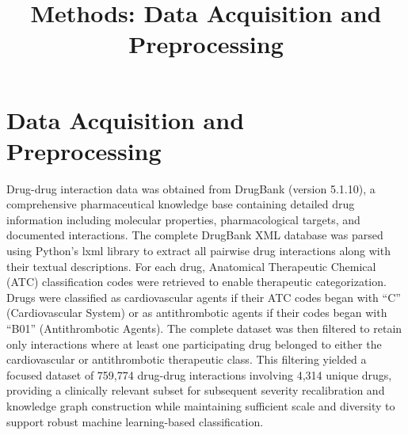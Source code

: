 \documentclass[11pt,a4paper]{article}
\title{\textbf{Methods: Data Acquisition and Preprocessing}}
\author{}
\date{}
\begin{document}
\maketitle

\section*{Data Acquisition and Preprocessing}

Drug-drug interaction data was obtained from DrugBank (version 5.1.10), a comprehensive pharmaceutical knowledge base containing detailed drug information including molecular properties, pharmacological targets, and documented interactions. The complete DrugBank XML database was parsed using Python's lxml library to extract all pairwise drug interactions along with their textual descriptions. For each drug, Anatomical Therapeutic Chemical (ATC) classification codes were retrieved to enable therapeutic categorization. Drugs were classified as cardiovascular agents if their ATC codes began with ``C'' (Cardiovascular System) or as antithrombotic agents if their codes began with ``B01'' (Antithrombotic Agents). The complete dataset was then filtered to retain only interactions where at least one participating drug belonged to either the cardiovascular or antithrombotic therapeutic class. This filtering yielded a focused dataset of 759,774 drug-drug interactions involving 4,314 unique drugs, providing a clinically relevant subset for subsequent severity recalibration and knowledge graph construction while maintaining sufficient scale and diversity to support robust machine learning-based classification.
\end{document}
